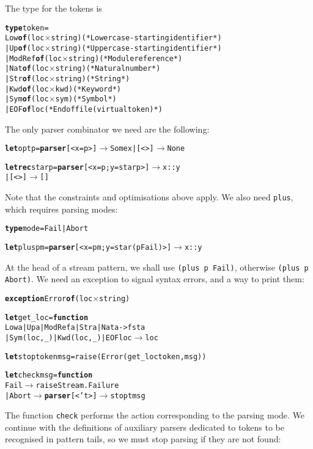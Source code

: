 The type for the tokens is
\begin{alltt}
\textbf{type} token =
  Low    \textbf{of} (loc \(\times\) string)  (* Lowercase-starting identifier *)
| Up     \textbf{of} (loc \(\times\) string)  (* Uppercase-starting identifier *)
| ModRef \textbf{of} (loc \(\times\) string)  (* Module reference *)
| Nat    \textbf{of} (loc \(\times\) string)  (* Natural number *)
| Str    \textbf{of} (loc \(\times\) string)  (* String *)
| Kwd    \textbf{of} (loc \(\times\) kwd)     (* Keyword *)
| Sym    \textbf{of} (loc \(\times\) sym)     (* Symbol *)
| EOF    \textbf{of} loc              (* End of file (virtual token) *)
\end{alltt}
The only parser combinator we need are the following:
\begin{alltt}
\textbf{let} opt p = \textbf{parser} [< x=p >] \(\rightarrow\) Some x | [<>] \(\rightarrow\) None

\textbf{let rec} star p = \textbf{parser} [< x=p; y=star p >] \(\rightarrow\) x::y
                      |                [<>] \(\rightarrow\) []
\end{alltt}
Note that the constraints and optimisations above apply. We also need
\texttt{plus}, which requires parsing modes:
\begin{alltt}
\textbf{type} mode = Fail | Abort

\textbf{let} plus p m = \textbf{parser} [< x=p m; y=star (p Fail) >] \(\rightarrow\) x::y 
\end{alltt}
At the head of a stream pattern, we shall use \texttt{(plus p Fail)},
otherwise \texttt{(plus p Abort)}. We need an exception to signal
syntax errors, and a way to print them:
\begin{alltt}
\textbf{exception} Error \textbf{of} (loc \(\times\) string)

\textbf{let} get\_loc = \textbf{function}
  Low a | Up a | ModRef a | Str a | Nat a -> fst a
| Sym (loc,\_) | Kwd (loc,\_) | EOF loc \(\rightarrow\) loc

\textbf{let} stop token msg = raise (Error (get\_loc token, msg))

\textbf{let} check msg = \textbf{function}
   Fail \(\rightarrow\) raise Stream.Failure
| Abort \(\rightarrow\) \textbf{parser} [< 't >] \(\rightarrow\) stop t msg
\end{alltt}
The function \texttt{check} performs the action corresponding to the
parsing mode. We continue with the definitions of auxiliary parsers
dedicated to tokens to be recognised in pattern tails, so we must stop
parsing if they are not found:
